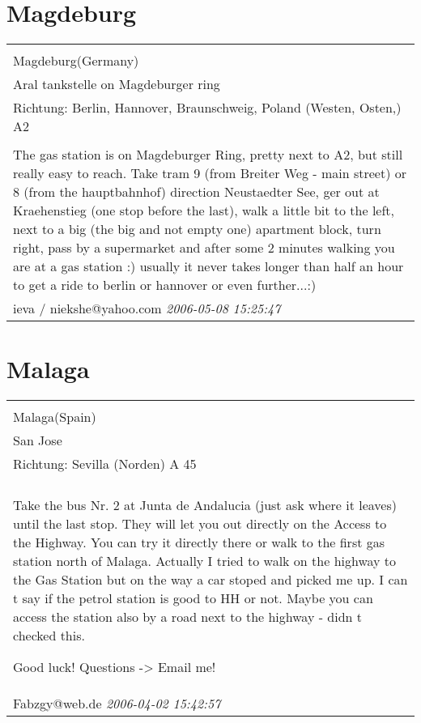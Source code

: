 \documentclass[a4paper,12pt]{article}
\begin{document}
\section{Magdeburg}
\begin{tabular}{|p{13cm}|}
\hline\\
Magdeburg(Germany)\\
Aral tankstelle on Magdeburger ring\\
Richtung: Berlin, Hannover, Braunschweig, Poland (Westen, Osten,) A2 \\
\hline\\
The gas station is on Magdeburger Ring, pretty next to A2, but still really easy to reach. Take tram 9 (from Breiter Weg - main street) or 8 (from the hauptbahnhof) direction Neustaedter See, ger out at Kraehenstieg (one stop before the last), walk a little bit to the left, next to a big (the big and not empty one) apartment block, turn right, pass by a supermarket and after some 2 minutes walking you are at a gas station :) usually it never takes longer than half an hour to get a ride to berlin or hannover or even further...:) \\
ieva / niekshe@yahoo.com \textit{ 2006-05-08 15:25:47 }\\\hline
\end{tabular}


\section{Malaga}
\begin{tabular}{|p{13cm}|}
\hline\\
Malaga(Spain)\\
San Jose\\
Richtung: Sevilla (Norden) A 45 \\
\hline\\
Take the bus Nr. 2 at Junta de Andalucia (just ask where it leaves) until the last stop. They will let you out directly on the Access to the Highway. You can try it directly there or walk to the first gas station north of Malaga. Actually I tried to walk on the highway to the Gas Station but on the way a car stoped and picked me up. I can t say if the petrol station is good to HH or not. Maybe you can access the station also by a road next to the highway - didn t checked this.

Good luck! Questions -> Email me! \\
Fabzgy@web.de \textit{ 2006-04-02 15:42:57 }\\\hline
\end{tabular}
\end{document}
